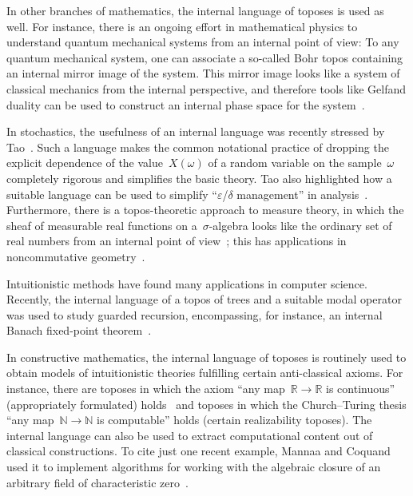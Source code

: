 \documentclass[10pt,reqno,a4paper]{amsbook}
\theoremstyle{definition}
\theoremstyle{plain}
\theoremstyle{remark}
\newcommand{\NN}{\mathbb{N}}
\newcommand{\RR}{\mathbb{R}}
\newcommand{\?}{\,{:}\,}
\renewcommand{\_}{\mathpunct{.}\,}
\begin{document}
{In other branches of mathematics, the internal language of toposes is used as well. For
instance, there is an ongoing effort in mathematical physics to understand
quantum mechanical systems from an internal point of view: To any quantum
mechanical system, one can associate a so-called Bohr topos containing an
internal mirror image of the system. This mirror image looks like a
system of classical mechanics from the internal perspective, and therefore
tools like Gelfand duality can be used to construct an internal
phase space for the system~\cite{bohr1,bohr2}.

In stochastics, the usefulness of an internal language was recently stressed by
Tao~\cite{tao:analysis-rel-measure-space}. Such a language makes the
common notational practice of dropping the explicit dependence of the
value~$X(\omega)$ of a random variable on the sample~$\omega$ completely
rigorous and simplifies the basic theory. Tao also highlighted how a suitable
language can be used to simplify ``$\varepsilon$/$\delta$ management'' in
analysis~\cite{tao:cheap-nsa}. Furthermore, there is a topos-theoretic approach to
measure theory, in which the sheaf of measurable real functions on
a~$\sigma$-algebra looks like the ordinary set of real numbers from an internal point
of view~\cite{jackson:sheaf-theoretic-measure-theory}; this has applications in
noncommutative geometry~\cite{henry:measure-theory-boolean-toposes}.

Intuitionistic methods have found many applications in computer science.
Recently, the internal language of a topos of trees and a suitable modal
operator was used to study guarded recursion, encompassing, for instance, an
internal Banach fixed-point theorem~\cite{birkedal:al:sgdt}.

In constructive mathematics, the internal language of toposes is routinely used
to obtain models of intuitionistic theories fulfilling certain anti-classical
axioms. For instance, there are toposes in which the axiom ``any map~$\RR \to
\RR$ is continuous'' (appropriately formulated) holds~\cite{kock:sdg,moerdijk:reyes:models}
and toposes in which the Church--Turing thesis ``any map~$\NN \to \NN$ is
computable'' holds (certain realizability toposes).
The internal language can also be used to extract computational content
out of classical constructions. To cite just one recent example, Mannaa and
Coquand used it to implement algorithms for working with the algebraic closure
of an arbitrary field of characteristic zero~\cite{mannaa:coquand:alg-closure}.

}
\end{document}
